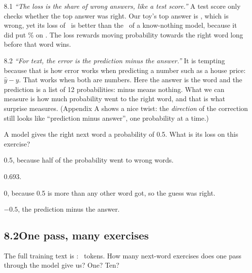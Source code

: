 \begin{wrongidea}{8.1}
\emph{``The loss is the share of wrong answers, like a test score.''} A test score only checks whether the
top answer was right. Our toy's top answer is , which is wrong, yet its loss of \nEightLossZero\ is
better than the \nEightUniformLoss\ of a know-nothing model, because it did put \nEightPctSorry\% on
. The loss rewards moving probability towards the right word long before that word wins.
\end{wrongidea}

\begin{wrongidea}{8.2}
\emph{``For text, the error is the prediction minus the answer.''} It is tempting because that is how
error works when predicting a number such as a house price: $\hat y - y$. That works when both are numbers. Here the answer is the
word  and the prediction is a list of 12 probabilities:  minus  means
nothing. What we can measure is how much probability went to the right word, and that is what surprise
measures. (Appendix A shows a nice twist: the \emph{direction} of the correction still looks like
``prediction minus answer'', one probability at a time.)
\end{wrongidea}

\begin{checkq}
A model gives the right next word a probability of 0.5. What is its loss on this exercise?
\begin{options}
\item 0.5, because half of the probability went to wrong words.
\item 0.693.
\item 0, because 0.5 is more than any other word got, so the guess was right.
\item $-0.5$, the prediction minus the answer.
\end{options}
\end{checkq}


\subsection*{8.2\quad One pass, many exercises}

\Predict The full training text is : \nEightSeqLen\
tokens. How many next-word exercises does one pass through the model give us? One? Ten?

